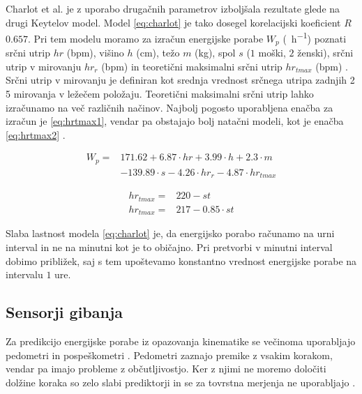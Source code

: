 Charlot et al. \cite{charlot2014improvement} je z uporabo drugačnih parametrov izboljšala rezultate glede na drugi Keytelov model. Model \eqref{eq:charlot} je tako dosegel korelacijski koeficient $R$ $0.657$. Pri tem modelu moramo za izračun energijske porabe $W_p$ (\si{\kcal.\hour^{-1}})  poznati srčni utrip $hr$ (\si{bpm}), višino $h$ (\si{\cm}), težo $m$ (\si{\kg}), spol $s$ ($1$ moški, $2$ ženski), srčni utrip v mirovanju $hr_r$ (\si{bpm}) in teoretični maksimalni srčni utrip $hr_{tmax}$ (\si{bpm}) \cite{charlot2014improvement}. Srčni utrip v mirovanju je definiran kot srednja vrednost srčnega utripa zadnjih \SI{2}{\min} \SI{5}{\min} mirovanja v ležečem položaju. Teoretični maksimalni srčni utrip lahko izračunamo na več različnih načinov. Najbolj pogosto uporabljena enačba za izračun je \eqref{eq:hrtmax1}, vendar pa obstajajo bolj natačni modeli, kot je enačba \eqref{eq:hrtmax2} \cite{miller1993predicting}. 

\begin{align}\label{eq:charlot}
W_p = & 171.62 + 6.87 \cdot hr + 3.99 \cdot h + 2.3 \cdot m \nonumber \\
& - 139.89 \cdot s - 4.26 \cdot hr_r - 4.87 \cdot hr_{tmax}
\end{align}

\begin{align}
	hr_{tmax} = & 220 - st \label{eq:hrtmax1}\\ 
    hr_{tmax} = & 217 - 0.85 \cdot st \label{eq:hrtmax2}
\end{align}

Slaba lastnost modela \eqref{eq:charlot} je, da energijsko porabo računamo na urni interval in ne na minutni kot je to običajno. Pri pretvorbi v minutni interval dobimo približek, saj s tem upoštevamo konstantno vrednost energijske porabe na intervalu $1$ ure. 





\subsection{Sensorji gibanja}\label{sec:senzorji-gibanja}

Za predikcijo energijske porabe iz opazovanja kinematike se večinoma uporabljajo pedometri in pospeškometri \cite{levine2005measurement}. Pedometri zaznajo premike z vsakim korakom, vendar pa imajo probleme z občutljivostjo. Ker  z njimi ne moremo določiti dolžine koraka so zelo slabi prediktorji in se za tovrstna merjenja ne uporabljajo \cite{levine2005measurement}.

